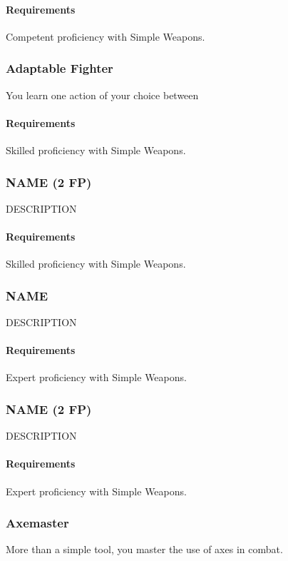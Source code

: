     \paragraph{Requirements} Competent proficiency with Simple Weapons.
\subsubsection{Adaptable Fighter} \label{feat::adaptablefighter}
    You learn one action of your choice between %
    \paragraph{Requirements} Skilled proficiency with Simple Weapons.
\subsubsection{NAME (2 FP)} \label{feat::name}
    DESCRIPTION
    \paragraph{Requirements} Skilled proficiency with Simple Weapons.
\subsubsection{NAME} \label{feat::name}
    DESCRIPTION
    \paragraph{Requirements} Expert proficiency with Simple Weapons.
\subsubsection{NAME (2 FP)} \label{feat::name}
    DESCRIPTION
    \paragraph{Requirements} Expert proficiency with Simple Weapons.

\subsubsection{Axemaster} \label{feat::axemaster}
    More than a simple tool, you master the use of axes in combat.

